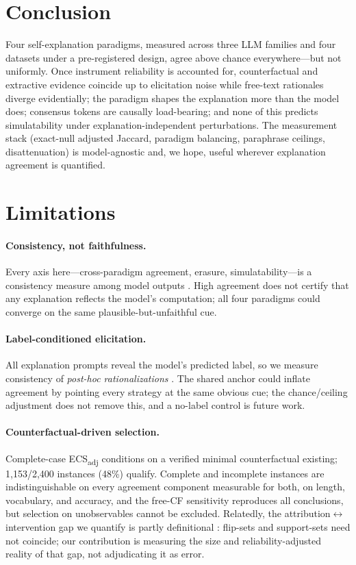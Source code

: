 \documentclass[11pt]{article}
\newcommand{\ecsadj}{\mbox{ECS\textsubscript{adj}}}
\begin{document}
\section{Conclusion}
\label{sec:conclusion}

Four self-explanation paradigms, measured across three LLM families and four datasets under a pre-registered design, agree above chance everywhere---but not uniformly. Once instrument reliability is accounted for, counterfactual and extractive evidence coincide up to elicitation noise while free-text rationales diverge evidentially; the paradigm shapes the explanation more than the model does; consensus tokens are causally load-bearing; and none of this predicts simulatability under explanation-independent perturbations. The measurement stack (exact-null adjusted Jaccard, paradigm balancing, paraphrase ceilings, disattenuation) is model-agnostic and, we hope, useful wherever explanation agreement is quantified.

\section*{Limitations}
\label{sec:limitations}

\paragraph{Consistency, not faithfulness.} Every axis here---cross-paradigm agreement, erasure, simulatability---is a consistency measure among model outputs \citep{parcalabescu2024measuring,jacovi2020towards}. High agreement does not certify that any explanation reflects the model's computation; all four paradigms could converge on the same plausible-but-unfaithful cue.

\paragraph{Label-conditioned elicitation.} All explanation prompts reveal the model's predicted label, so we measure consistency of \emph{post-hoc rationalizations} \citep{wiegreffe2021measuring,turpin2023language}. The shared anchor could inflate agreement by pointing every strategy at the same obvious cue; the chance/ceiling adjustment does not remove this, and a no-label control is future work.

\paragraph{Counterfactual-driven selection.} Complete-case \ecsadj{} conditions on a verified minimal counterfactual existing; 1{,}153/2{,}400 instances (48\%) qualify. Complete and incomplete instances are indistinguishable on every agreement component measurable for both, on length, vocabulary, and accuracy, and the free-CF sensitivity reproduces all conclusions, but selection on unobservables cannot be excluded. Relatedly, the attribution$\leftrightarrow$intervention gap we quantify is partly definitional \citep{mothilal2021towards}: flip-sets and support-sets need not coincide; our contribution is measuring the size and reliability-adjusted reality of that gap, not adjudicating it as error.
\end{document}
